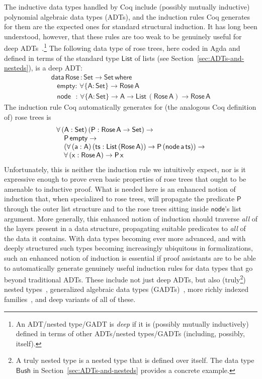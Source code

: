 \documentclass[sigplan,10pt,anonymous,review]{acmart}
\begin{document}
The inductive data types handled by Coq include (possibly mutually
inductive) polynomial algebraic data types (ADTs), and the induction
rules Coq generates for them are the expected ones for standard
structural induction. It has long been understood, however, that these
rules are too weak to be genuinely useful for deep
ADTs~\cite{jp20}.\footnote{An ADT/nested type/GADT is {\em deep} if it
  is (possibly mutually inductively) defined in terms of other
  ADTs/nested types/GADTs (including, possibly, itself).}  The
following data type of rose trees, here coded in Agda and defined in
terms of the standard type $\mathsf{List}$ of lists (see
Section~\ref{sec:ADTs-and-nesteds}), is a deep ADT:
\[\begin{array}{l}
\mathsf{data\, Rose\, : Set \to Set\,where}\\
\mathsf{\;\;\;empty :\,\forall \{A : Set\} \to Rose\,A}\\
\mathsf{\;\;\;node\,\,\,\, :\, \forall \{A : Set\} \to A \to List\,(Rose\,A) \to Rose\,A} 
\end{array}\]
The induction rule Coq automatically generates for (the analogous Coq
definition of) rose trees is
\[\begin{array}{l}
\mathsf{\forall\, (A : Set)\,(P : Rose\,A \to Set) \to}\\
\mathsf{\hspace*{0.15in}P\,empty \to}\\
\mathsf{\hspace*{0.15in}
 (\forall\, (a : A)\,(ts :
  List\,(Rose\,A)) \to P\,(node\,a\,ts)) \to}\\ 
\hspace*{0.15in}  \mathsf{\forall \,(x : Rose\,A) \to P\,x}
\end{array}\]
\noindent
Unfortunately, this is neither the induction rule we intuitively
expect, nor is it expressive enough to prove even basic properties of
rose trees that ought to be amenable to inductive proof. What is
needed here is an enhanced notion of induction that, when specialized
to rose trees, will propagate the predicate $\mathsf{P}$ through the
outer list structure and to the rose trees sitting inside
$\mathsf{node}$'s list argument. More generally, this enhanced notion
of induction should traverse {\em all} of the layers present in a data
structure, propagating suitable predicates to {\em all} of the data it
contains.  With data types becoming ever more advanced, and with
deeply structured such types becoming increasingly ubiquitous in
formalizations, such an enhanced notion of induction is essential if
proof assistants are to be
able to automatically generate genuinely useful induction rules for
data types that go
beyond traditional ADTs. These
include not just deep ADTs, but also (truly\footnote{A truly nested
  type is a nested type that is defined over itself. The data type
  $\mathsf{Bush}$ in Section~\ref{sec:ADTs-and-nesteds} provides a
  concrete example.}) nested types~\cite{bm98},
generalized algebraic data types
(GADTs)~\cite{ch03,pvww06,sp04,xcc03}, more richly indexed
families~\cite{dyb94}, and deep variants of all of these.
\end{document}
